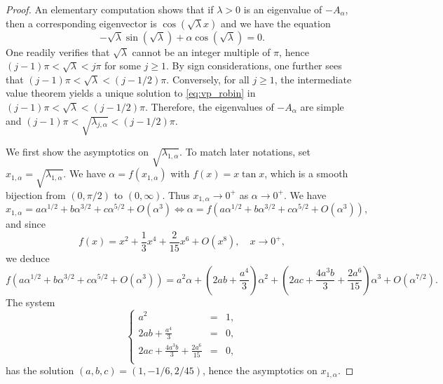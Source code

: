 \documentclass[10pt,a4paper]{amsart}
\begin{document}
\begin{proof}
An elementary computation shows that if $\lambda > 0$ is an eigenvalue of $-A_\alpha$, then a corresponding eigenvector is $\cos(\sqrt{\lambda}x)$ and we have the equation 
\begin{equation}\label{eq:vp_robin}
    - \sqrt{\lambda} \sin(\sqrt{\lambda}) + \alpha \cos(\sqrt{\lambda}) = 0. 
\end{equation}
One readily verifies that $\sqrt{\lambda}$ cannot be an integer multiple of $\pi$, hence $(j-1) \pi < \sqrt{\lambda} < j\pi$ for some $j \geq 1$. By sign considerations, one further sees that $(j-1) \pi < \sqrt{\lambda} < (j-1/2)\pi$. Conversely, for all $j \geq 1$, the intermediate value theorem yields a unique solution to \eqref{eq:vp_robin} in $(j-1) \pi < \sqrt{\lambda} < (j-1/2)\pi$. Therefore, the eigenvalues of $-A_\alpha$ are simple and $(j-1) \pi < \sqrt{\lambda_{j,\alpha}} < (j-1/2)\pi$. 

We first show the asymptotics on $\sqrt{\lambda_{1,\alpha}}$. To match later notations, set $x_{1,\alpha}=\sqrt{\lambda_{1,\alpha}}$. We have $\alpha = f(x_{1,\alpha})$ with $f(x) = x \tan x$, which is a smooth bijection from $(0,\pi/2)$ to $(0,\infty)$. Thus $x_{1,\alpha} \to 0^+$ as $\alpha \to 0^+$. We have 
\[
x_{1,\alpha} = a\alpha^{1/2} +b\alpha^{3/2} +c \alpha^{5/2} + O(\alpha^3) \Longleftrightarrow \alpha = f\left( a\alpha^{1/2} +b\alpha^{3/2} +c \alpha^{5/2} + O(\alpha^3) \right),
\]
and since   
\[
f(x) = x^2 + \frac{1}{3}x^4 + \frac{2}{15} x^6 + O(x^8) ,\quad x \to 0^+,
\]
we deduce 
\[
f\left( a\alpha^{1/2} +b\alpha^{3/2} +c \alpha^{5/2} + O(\alpha^3) \right) = a^2 \alpha + \left(2ab + \frac{a^4}{3}\right)\alpha^2 + \left(2ac + \frac{4a^3b}{3} + \frac{2a^6}{15}\right) \alpha^3 + O(\alpha^{7/2}).
\]
The system 
\[
\left\lbrace \begin{array}{lcc}
a^2 &=& 1,\\
\displaystyle 2ab + \frac{a^4}{3} &=& 0, \\
\displaystyle 2ac + \frac{4a^3b}{3} + \frac{2a^6}{15} &=& 0, \\
\end{array}\right.
\]
has the solution $(a,b,c) = (1,-1/6,2/45)$, hence the asymptotics on $x_{1,\alpha}$. 



\end{proof}
\end{document}
